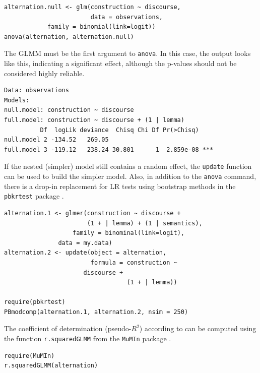 \documentclass[a4paper,12pt]{article}
\begin{document}
\begin{lstlisting}
alternation.null <- glm(construction ~ discourse,
                        data = observations,
			family = binomial(link=logit))
anova(alternation, alternation.null)
\end{lstlisting}

The GLMM must be the first argument to \texttt{anova}.
In this case, the output looks like this, indicating a significant effect, although the p-values should not be considered highly reliable.

\vspace{0.5\baselineskip}

\begin{lstlisting}
Data: observations
Models:
null.model: construction ~ discourse
full.model: construction ~ discourse + (1 | lemma)
          Df  logLik deviance  Chisq Chi Df Pr(>Chisq)    
null.model 2 -134.52   269.05                             
full.model 3 -119.12   238.24 30.801      1  2.859e-08 ***
\end{lstlisting}

If the nested (simpler) model still contains a random effect, the \texttt{update} function can be used to build the simpler model.
Also, in addition to the \texttt{anova} command, there is a drop-in replacement for LR tests using bootstrap methods in the \texttt{pbkrtest} package \citep{HalekohHojsgaard2014}.

\vspace{0.5\baselineskip}

\begin{lstlisting}
alternation.1 <- glmer(construction ~ discourse +
                       (1 + | lemma) + (1 | semantics),
	               family = binominal(link=logit),
		       data = my.data)
alternation.2 <- update(object = alternation,
                        formula = construction ~
			          discourse +
                                  (1 + | lemma))

require(pbkrtest)
PBmodcomp(alternation.1, alternation.2, nsim = 250)
\end{lstlisting}

The coefficient of determination (pseudo-$R^2$) according to \citet{NakagawaSchielzeth2013} can be computed using the function \texttt{r.squaredGLMM} from the \texttt{MuMIn} package \citep{Barton2016}.

\vspace{0.5\baselineskip}

\begin{lstlisting}
require(MuMIn)
r.squaredGLMM(alternation)
\end{lstlisting}
\end{document}
